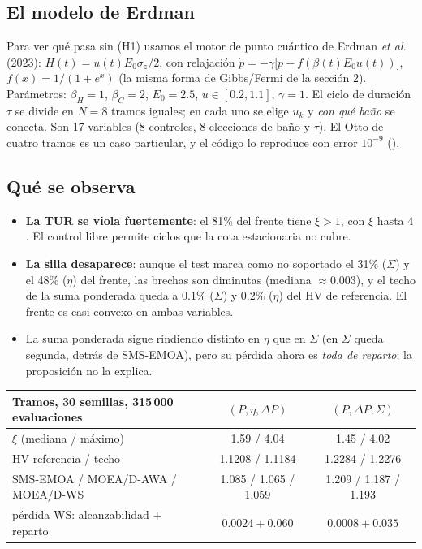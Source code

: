 \subsection{El modelo de Erdman}

Para ver qué pasa sin (H1) usamos el motor de punto cuántico de Erdman \emph{et al.} (2023):
$H(t) = u(t)E_0\sigma_z/2$, con relajación $\dot p = -\gamma\bigl[p - f(\beta(t)E_0u(t))\bigr]$,
$f(x) = 1/(1+e^x)$ (la misma forma de Gibbs/Fermi de la sección 2). Parámetros: $\beta_H = 1$,
$\beta_C = 2$, $E_0 = 2.5$, $u\in[0.2,1.1]$, $\gamma = 1$. El ciclo de duración $\tau$ se divide en
$N = 8$ tramos iguales; en cada uno se elige $u_k$ y \emph{con qué baño} se conecta. Son 17
variables (8 controles, 8 elecciones de baño y $\tau$). El Otto de cuatro tramos es un caso
particular, y el código lo reproduce con error $10^{-9}$ ().

\subsection{Qué se observa}

\begin{itemize}
\item \textbf{La TUR se viola fuertemente}: el 81\% del frente tiene $\xi > 1$, con $\xi$ hasta
  $4$. El control libre permite ciclos que la cota estacionaria no cubre.
\item \textbf{La silla desaparece}: aunque el test marca como no soportado el 31\% ($\Sigma$) y el
  48\% ($\eta$) del frente, las brechas son diminutas (mediana $\approx 0.003$), y el techo de la
  suma ponderada queda a $0.1\%$ ($\Sigma$) y $0.2\%$ ($\eta$) del HV de referencia. El frente es
  casi convexo en ambas variables.
\item La suma ponderada sigue rindiendo distinto en $\eta$ que en $\Sigma$ (en $\Sigma$ queda segunda,
  detrás de SMS-EMOA), pero su pérdida ahora es \emph{toda de reparto}; la proposición no la explica.
\end{itemize}

\begin{center}
\begin{tabular}{lcc}
\toprule
Tramos, 30 semillas, 315\,000 evaluaciones & $(P,\eta,\Delta P)$ & $(P,\Delta P,\Sigma)$\\
\midrule
$\xi$ (mediana / máximo) & 1.59 / 4.04 & 1.45 / 4.02\\
HV referencia / techo & 1.1208 / 1.1184 & 1.2284 / 1.2276\\
SMS-EMOA / MOEA/D-AWA / MOEA/D-WS & 1.085 / 1.065 / 1.059 & 1.209 / 1.187 / 1.193\\
pérdida WS: alcanzabilidad $+$ reparto & $0.0024 + 0.060$ & $0.0008 + 0.035$\\
\bottomrule
\end{tabular}
\end{center}

